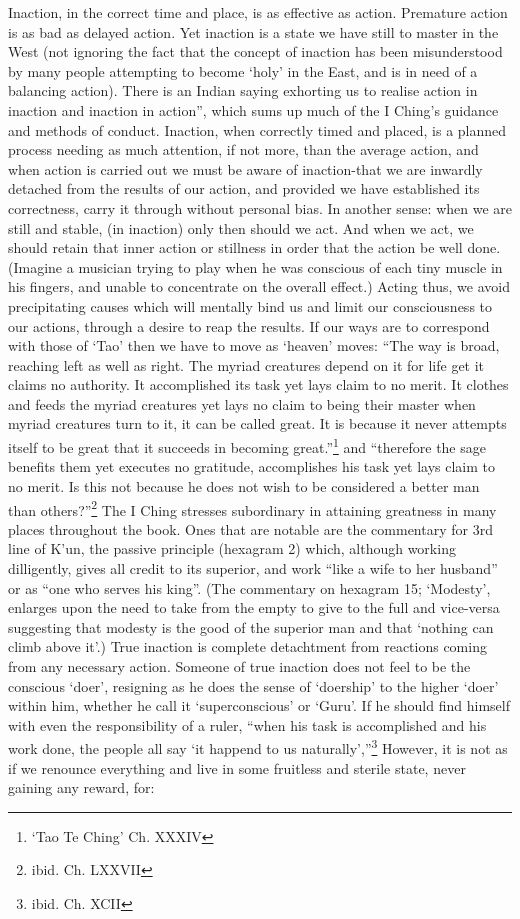 \documentclass[11pt]{book}
\begin{document}
Inaction, in the correct time and place, is as effective as action. Premature action is as bad as delayed action. Yet inaction is a state we have still to master in the West (not ignoring the fact that the concept of inaction has been misunderstood by many people attempting to become `holy' in the East, and is in need of a balancing action). There is an Indian saying exhorting us to realise action in inaction and inaction in action'', which sums up much of the I Ching's guidance and methods of conduct. Inaction, when correctly timed and placed, is a planned process needing as much attention, if not more, than the average action, and when action is carried out we must be aware of inaction-that we are inwardly detached from the results of our action, and provided we have established its correctness, carry it through without personal bias. In another sense: when we are still and stable, (in inaction) only then should we act. And when we act, we should retain that inner action or stillness in order that the action be well done. (Imagine a musician trying to play when he was conscious of each tiny muscle in his fingers, and unable to concentrate on the overall effect.) Acting thus, we avoid precipitating causes which will mentally bind us and limit our consciousness to our actions, through a desire to reap the results. If our ways are to correspond with those of `Tao' then we have to move as `heaven' moves: ``The way is broad, reaching left as well as right. The myriad creatures depend on it for life get it claims no authority. It accomplished its task yet lays claim to no merit. It clothes and feeds the myriad creatures yet lays no claim to being their master when myriad creatures turn to it, it can be called great. It is because it never attempts itself to be great that it succeeds in becoming great.''\footnote{`Tao Te Ching' Ch. XXXIV} and ``therefore the sage benefits them yet executes no gratitude, accomplishes his task yet lays claim to no merit. Is this not because he does not wish to be considered a better man than others?''\footnote{ibid. Ch. LXXVII} The I Ching stresses subordinary in attaining greatness in many places throughout the book. Ones that are notable are the commentary for 3rd line of K'un, the passive principle (hexagram 2) which, although working dilligently, gives all credit to its superior, and work ``like a wife to her husband'' or as ``one who serves his king''. (The commentary on hexagram 15; `Modesty', enlarges upon the need to take from the empty to give to the full and vice-versa suggesting that modesty is the good of the superior man and that `nothing can climb above it'.) True inaction is complete detachtment from reactions coming from any necessary action. Someone of true inaction does not feel to be the conscious `doer', resigning as he does the sense of `doership' to the higher `doer' within him, whether he call it `superconscious' or `Guru'. If he should find himself with even the responsibility of a ruler, ``when his task is accomplished and his work done, the people all say `it happend to us naturally',''\footnote{ibid. Ch. XCII} However, it is not as if we renounce everything and live in some fruitless and sterile state, never gaining any reward, for:
\end{document}
